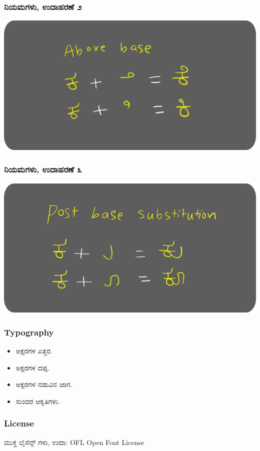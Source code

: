 \documentclass[16pt]{beamer}
\newcommand\en[1]{{\english #1}}
\begin{document}
\begin{spacing}{1.6}
  \begin{frame}
    \frametitle{ನಿಯಮಗಳು, ಉದಾಹರಣೆ ೨}
    \includegraphics[width=\textwidth]{images/abvs-bg.png}
  \end{frame}

  \begin{frame}
    \frametitle{ನಿಯಮಗಳು, ಉದಾಹರಣೆ ೩}
    \includegraphics[width=\textwidth]{images/psts-bg.png}
  \end{frame}

  \begin{frame}
    \frametitle{\en{Typography}}
    \begin{itemize}
    \item ಅಕ್ಷರಗಳ ಎತ್ತರ.
    \item ಅಕ್ಷರಗಳ ದಪ್ಪ.
    \item ಅಕ್ಷರಗಳ ನಡುವಿನ ಜಾಗ.
    \item ಸುಂದರ ಆಕೃತಿಗಳು.
    \end{itemize}
  \end{frame}

  \begin{frame}
    \frametitle{\en{License}}
    ಮುಕ್ತ ಲೈಸೆನ್ಸ್ ಗಳು, ಉದಾ: \en{OFL Open Font License}
  \end{frame}


\end{spacing}
\end{document}
